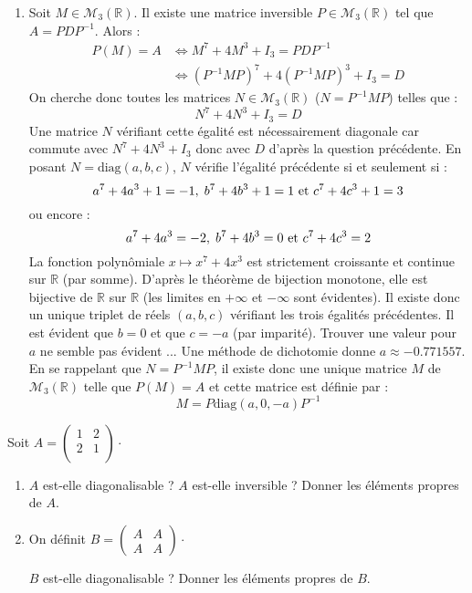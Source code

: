 \documentclass[a4paper,10pt]{report}
\begin{document}
\begin{enumerate}
\item Soit $M \in \mathcal{M}_3(\mathbb{R})$. Il existe une matrice inversible $P \in \mathcal{M}_3(\mathbb{R})$ tel que $A=PDP^{-1}$. Alors :
\begin{align*}
P(M) =A & \Longleftrightarrow M^7+4M^3 + I_3 = PDP^{-1} \\
& \Longleftrightarrow (P^{-1}MP)^7 + 4(P^{-1}MP)^3+ I_3 = D 
\end{align*}
On cherche donc toutes les matrices $N \in \mathcal{M}_3(\mathbb{R})$ ($N=P^{-1}MP$) telles que :
$$ N^7+4N^3+I_3=D$$
Une matrice $N$ vérifiant cette égalité est nécessairement diagonale car commute avec $N^7+4N^3+I_3$ donc avec $D$ d'après la question précédente. En posant $N= \textrm{diag}(a,b,c)$, $N$ vérifie l'égalité précédente si et seulement si :
$$ a^7+ 4a^3+1= -1, \; b^7+ 4b^3+1= 1 \hbox{ et } c^7+ 4c^3+1= 3 $$
ou encore :
$$ a^7+ 4a^3= -2, \; b^7+ 4b^3= 0 \hbox{ et } c^7+ 4c^3= 2 $$
La fonction polynômiale $x \mapsto x^7+4x^3$ est strictement croissante et continue sur $\mathbb{R}$ (par somme). D'après le théorème de bijection monotone, elle est bijective de $\mathbb{R}$ sur $\mathbb{R}$ (les limites en $+ \infty$ et $- \infty$ sont évidentes). Il existe donc un unique triplet de réels $(a,b,c)$ vérifiant les trois égalités précédentes. Il est évident que $b=0$ et que $c=-a$ (par imparité). Trouver une valeur pour $a$ ne semble pas évident ... Une méthode de dichotomie donne $a \approx -0.771557$. En se rappelant que $N=P^{-1}MP$, il existe donc une unique matrice $M$ de $\mathcal{M}_3(\mathbb{R})$ telle que $P(M)=A$ et cette matrice est définie par :
$$ M = P \textrm{diag}(a,0,-a) P^{-1}$$
\end{enumerate}


\begin{Exercice}{} Soit $A= \begin{pmatrix}
1& 2 \\
2 & 1 \\
\end{pmatrix}\cdot$
\begin{enumerate}
\item $A$ est-elle diagonalisable ? $A$ est-elle inversible ? Donner les éléments propres de $A$.
\item  On définit $B = \begin{pmatrix}
A & A \\
A & A 
\end{pmatrix}\cdot$

$B$ est-elle diagonalisable ? Donner les éléments propres de $B$.
\end{enumerate}
\end{Exercice}
\end{document}
